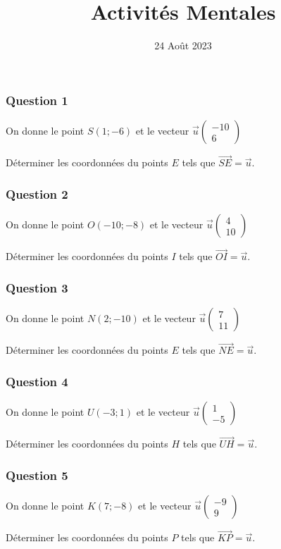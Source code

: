 \documentclass[15pt, mathserif]{beamer}
\title{Activités Mentales}
\date{24 Août 2023}
\begin{document}
\begin{frame}
    \titlepage
\end{frame}

\begin{frame} 
	\frametitle{Question 1}
On donne le point $S(1;-6)$ et le vecteur $\vec{u}\begin{pmatrix} -10\\ 6 \end{pmatrix}$ 
 
 Déterminer les coordonnées du points $E$ tels que $\vec{SE}=\vec{u}$.\end{frame}


\begin{frame} 
	\frametitle{Question 2}
On donne le point $O(-10;-8)$ et le vecteur $\vec{u}\begin{pmatrix} 4\\ 10 \end{pmatrix}$ 
 
 Déterminer les coordonnées du points $I$ tels que $\vec{OI}=\vec{u}$.\end{frame}


\begin{frame} 
	\frametitle{Question 3}
On donne le point $N(2;-10)$ et le vecteur $\vec{u}\begin{pmatrix} 7\\ 11 \end{pmatrix}$ 
 
 Déterminer les coordonnées du points $E$ tels que $\vec{NE}=\vec{u}$.\end{frame}


\begin{frame} 
	\frametitle{Question 4}
On donne le point $U(-3;1)$ et le vecteur $\vec{u}\begin{pmatrix} 1\\ -5 \end{pmatrix}$ 
 
 Déterminer les coordonnées du points $H$ tels que $\vec{UH}=\vec{u}$.\end{frame}


\begin{frame} 
	\frametitle{Question 5}
On donne le point $K(7;-8)$ et le vecteur $\vec{u}\begin{pmatrix} -9\\ 9 \end{pmatrix}$ 
 
 Déterminer les coordonnées du points $P$ tels que $\vec{KP}=\vec{u}$.\end{frame}
\end{document}
